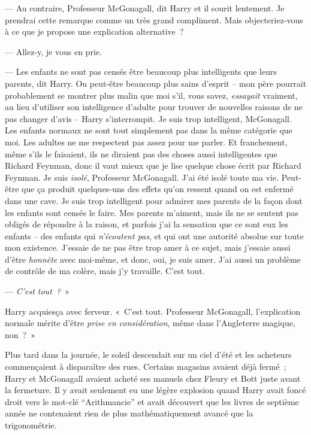 --- Au contraire, Professeur McGonagall, dit Harry et il sourit lentement. Je prendrai cette remarque comme un très grand compliment. Mais objecteriez-vous à ce que je propose une explication alternative~?

--- Allez-y, je vous en prie.

--- Les enfants ne sont pas censés être beaucoup plus intelligents que leurs parents, dit Harry. Ou peut-être beaucoup plus sains d'esprit -- mon père pourrait probablement se montrer plus malin que moi s'il, vous savez, \emph{essayait} vraiment, au lieu d'utiliser son intelligence d'adulte pour trouver de nouvelles raisons de ne pas changer d'avis -- Harry s'interrompit. Je suis trop intelligent, McGonagall. Les enfants normaux ne sont tout simplement pas dans la même catégorie que moi. Les adultes ne me respectent pas assez pour me parler. Et franchement, même s'ils le faisaient, ils ne diraient pas des choses aussi intelligentes que Richard Feynman, donc il vaut mieux que je lise quelque chose écrit par Richard Feynman. Je suis \emph{isolé}, Professeur McGonagall. J'ai été isolé toute ma vie. Peut-être que ça produit quelques-uns des effets qu'on ressent quand on est enfermé dans une cave. Je suis trop intelligent pour admirer mes parents de la façon dont les enfants sont censés le faire. Mes parents m'aiment, mais ils ne se sentent pas obligés de répondre à la raison, et parfois j'ai la sensation que ce sont eux les enfants -- des enfants qui \emph{n'écoutent pas}, et qui ont une autorité absolue sur toute mon existence. J'essaie de ne pas être trop amer à ce sujet, mais j'essaie aussi d'être \emph{honnête} avec moi-même, et donc, oui, je suis amer. J'ai aussi un problème de contrôle de ma colère, mais j'y travaille. C'est tout.

--- \emph{C'est tout~?}~»

Harry acquiesça avec ferveur. «~C'est tout. Professeur McGonagall, l'explication normale mérite d'être \emph{prise en considération}, même dans l'Angleterre magique, non~?~»

\later

Plus tard dans la journée, le soleil descendait sur un ciel d'été et les acheteurs commençaient à disparaître des rues. Certains magasins avaient déjà fermé~; Harry et McGonagall avaient acheté ses manuels chez Fleury et Bott juste avant la fermeture. Il y avait seulement eu une légère explosion quand Harry avait foncé droit vers le mot-clé “Arithmancie” et avait découvert que les livres de septième année ne contenaient rien de plus mathématiquement avancé que la trigonométrie.

